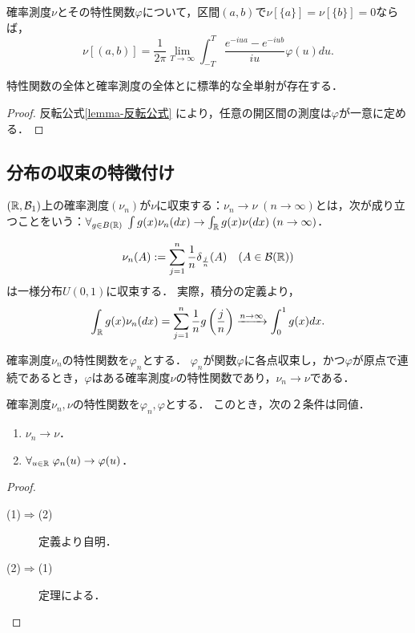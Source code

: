 \documentclass[uplatex,dvipdfmx]{jsreport}
\begin{document}
\begin{lemma}\label{lemma-反転公式}
    確率測度$\nu$とその特性関数$\varphi$について，区間$(a,b)$で$\nu[\{a\}]=\nu[\{b\}]=0$ならば，
    \[\nu[(a,b)]=\frac{1}{2\pi}\lim_{T\to\infty}\int^T_{-T}\frac{e^{-iua}-e^{-iub}}{iu}\varphi(u)du.\]
\end{lemma}

\begin{theorem}[特性関数は分布を特徴付ける]
    特性関数の全体と確率測度の全体とに標準的な全単射が存在する．
\end{theorem}
\begin{proof}
    反転公式\ref{lemma-反転公式}
    により，任意の開区間の測度は$\varphi$が一意に定める．
\end{proof}

\subsection{分布の収束の特徴付け}

\begin{definition}
    $(\mathbb{R},\mathcal{B}_1)$上の確率測度$(\nu_n)$が$\nu$に収束する：$\nu_n\to\nu\;(n\to\infty)$とは，次が成り立つことをいう：$\forall_{g\in B(\mathbb{R})}\;\int g(x)\nu_n(dx)\to\int_{\mathbb{R}} g(x)\nu(dx)\;(n\to\infty)$．
\end{definition}
\begin{example}
    \[\nu_n(A):=\sum^n_{j=1}\frac{1}{n}\delta_{\frac{j}{n}}(A)\quad(A\in\mathcal{B}(\mathbb{R}))\]
    は一様分布$U(0,1)$に収束する．
    実際，積分の定義より，
    \[\int_{\mathbb{R}} g(x)\nu_n(dx)=\sum^n_{j=1}\frac{1}{n}g\left(\frac{j}{n}\right)\xrightarrow{n\to\infty}\int^1_0g(x)dx.\]
\end{example}

\begin{theorem}
    確率測度$\nu_n$の特性関数を$\varphi_n$とする．
    $\varphi_n$が関数$\varphi$に各点収束し，かつ$\varphi$が原点で連続であるとき，$\varphi$はある確率測度$\nu$の特性関数であり，$\nu_n\to\nu$である．
\end{theorem}

\begin{corollary}[Glivenko]
    確率測度$\nu_n,\nu$の特性関数を$\varphi_n,\varphi$とする．
    このとき，次の２条件は同値．
    \begin{enumerate}
        \item $\nu_n\to\nu$．
        \item $\forall_{u\in\mathbb{R}}\;\varphi_n(u)\to\varphi(u)$．
    \end{enumerate}
\end{corollary}
\begin{proof}\mbox{}
    \begin{description}
        \item[(1)$\Rightarrow$(2)] 定義より自明．
        \item[(2)$\Rightarrow$(1)] 定理による．
    \end{description}
\end{proof}
\end{document}
